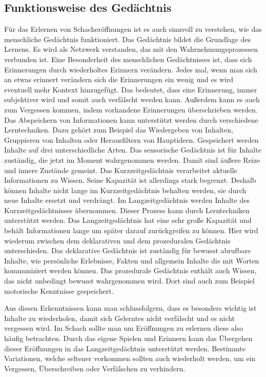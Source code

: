 \subsection{Funktionsweise des Gedächtnis}\label{gedächtnis}
Für das Erlernen von Schacheröffnungen ist es auch sinnvoll zu verstehen, wie das menschliche Gedächtnis funktioniert. Das Gedächtnis bildet die Grundlage des Lernens. Es wird als Netzwerk verstanden, das mit den Wahrnehmungsprozessen verbunden ist. Eine Besonderheit des menschlichen Gedächtnisses ist, dass sich Erinnerungen durch wiederholtes Erinnern verändern. Jedes mal, wenn man sich an etwas erinnert verändern sich die Erinnerungen ein wenig und es wird eventuell mehr Kontext hinzugefügt. Das bedeutet, dass eine Erinnerung, immer subjektiver wird und somit auch verfälscht werden kann. Außerdem kann es auch zum Vergessen kommen, indem vorhandene Erinnerungen überschrieben werden. Das Abspeichern von Informationen kann unterstützt werden durch verschiedene Lerntechniken. Dazu gehört zum Beispiel das Wiedergeben von Inhalten, Gruppieren von Inhalten oder Herausfiltern von Hauptideen. Gespeichert werden Inhalte auf drei unterschiedliche Arten. Das sensorische Gedächtnis ist für Inhalte zuständig, die jetzt im Moment wahrgenommen werden. Damit sind äußere Reize und innere Zustände gemeint. Das Kurzzeitgedächtnis verarbeitet aktuelle Informationen zu Wissen. Seine Kapazität ist allerdings stark begrenzt. Deshalb können Inhalte nicht lange im Kurzzeitgedächtnis behalten werden, sie durch neue Inhalte ersetzt und verdrängt. Im Langzeitgedächtnis werden Inhalte des Kurzzeitgedächtnisses übernommen. Dieser Prozess kann durch Lerntechniken unterstützt werden. Das Langzeitgedächtnis hat eine sehr große Kapazität und behält Informationen lange um später darauf zurückgreifen zu können. Hier wird wiederum zwischen dem deklarativen und dem prozeduralen Gedächtnis unterschieden. Das deklarative Gedächtnis ist zuständig für bewusst abrufbare Inhalte, wie persönliche Erlebnisse, Fakten und allgemein Inhalte die mit Worten kommuniziert werden können. Das prozedurale Gedächtnis enthält auch Wissen, das nicht unbedingt bewusst wahrgenommen wird. Dort sind auch zum Beispiel motorische Kenntnisse gespeichert.
\cite{kron_grundwissen_2024}

Aus diesen Erkenntnissen kann man schlussfolgern, dass es besonders wichtig ist Inhalte zu wiederholen, damit sich Gelerntes nicht verfälscht und es nicht vergessen wird. Im Schach sollte man um Eröffnungen zu erlernen diese also häufig betrachten. Durch das eigene Spielen und Erinnern kann das Übergehen dieser Eröffnungen in das Langzeitgedächtnis unterstützt werden. Bestimmte Variationen, welche seltener vorkommen sollten auch wiederholt werden, um ein Vergessen, Überschreiben oder Verfälschen zu verhindern.

